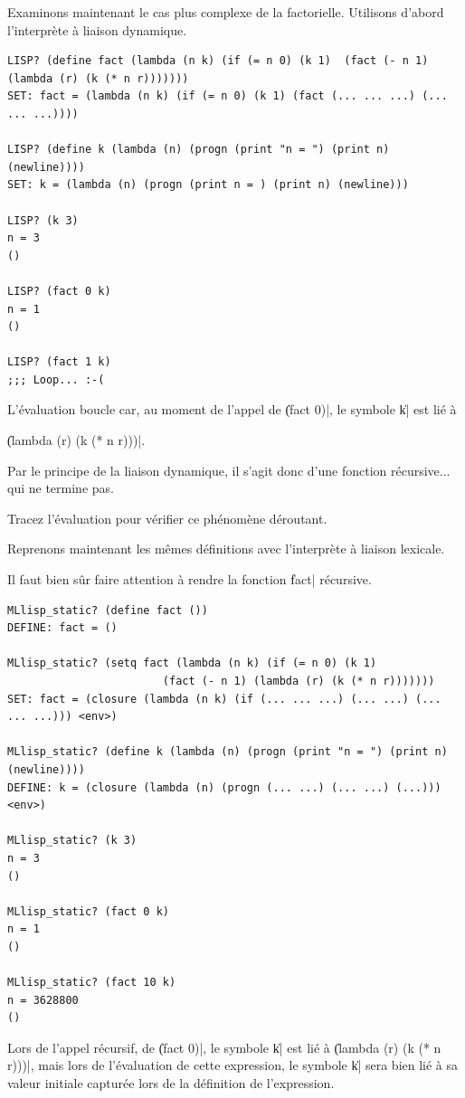 \documentclass{../../LaTeX/tdsimple}
\begin{document}
Examinons maintenant le cas plus complexe de la factorielle. Utilisons
d'abord l'interprète à liaison dynamique.
\begin{lstlisting}
LISP? (define fact (lambda (n k) (if (= n 0) (k 1)  (fact (- n 1) (lambda (r) (k (* n r)))))))
SET: fact = (lambda (n k) (if (= n 0) (k 1) (fact (... ... ...) (... ... ...))))

LISP? (define k (lambda (n) (progn (print "n = ") (print n) (newline))))
SET: k = (lambda (n) (progn (print n = ) (print n) (newline)))

LISP? (k 3)
n = 3
()

LISP? (fact 0 k)
n = 1
()

LISP? (fact 1 k)
;;; Loop... :-(
\end{lstlisting}
L'évaluation boucle car, au moment de l'appel de \|(fact 0)|, le
symbole \|k| est lié à
\begin{center}
  \|(lambda (r) (k (* n r)))|.
\end{center}
Par le principe de la liaison dynamique, il s'agit donc d'une fonction
récursive... qui ne termine pas.

\begin{question}
  Tracez l'évaluation pour vérifier ce phénomène déroutant.
\end{question}

Reprenons maintenant les mêmes définitions avec l'interprète à liaison
lexicale.
\begin{attention}
  Il faut bien sûr faire attention à rendre la fonction \|fact|
  récursive.
\end{attention}
\begin{lstlisting}
MLlisp_static? (define fact ())
DEFINE: fact = ()

MLlisp_static? (setq fact (lambda (n k) (if (= n 0) (k 1)  
                        (fact (- n 1) (lambda (r) (k (* n r)))))))
SET: fact = (closure (lambda (n k) (if (... ... ...) (... ...) (... ... ...))) <env>)

MLlisp_static? (define k (lambda (n) (progn (print "n = ") (print n) (newline))))
DEFINE: k = (closure (lambda (n) (progn (... ...) (... ...) (...))) <env>)

MLlisp_static? (k 3)
n = 3
()

MLlisp_static? (fact 0 k)
n = 1
()

MLlisp_static? (fact 10 k)
n = 3628800
()
\end{lstlisting}
Lors de l'appel récursif, de \|(fact 0)|, le symbole \|k| est lié à
\|(lambda (r) (k (* n r)))|, mais lors de l'évaluation de cette
expression, le symbole \|k| sera bien lié à sa valeur initiale
capturée lors de la définition de l'expression.
\end{document}
